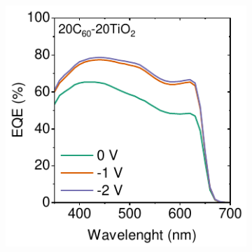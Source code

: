 \begin{figure}[ht!]
\begin{subfigure}{0.32\textwidth}
        \caption{}
        \label{}
    \end{subfigure}
    \hfill
    \begin{subfigure}{0.32\textwidth}
        \centering
        \includegraphics[width=\textwidth]{chapters/transport_layers/images/EQE_20_20.pdf}
        \caption{}
        \label{}
    \end{subfigure}


\end{figure}

